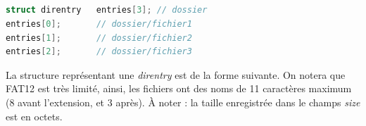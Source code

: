 \documentclass[11pt,a4paper]{article}
\begin{document}
\begin{table}[ht!]
  \centering
  \begin{minipage}{0.3\textwidth}

\noindent {} \\
 \\
 \\
 \\

  \end{minipage}
  \hfillx
  \begin{minipage}{0.6\textwidth}

\begin{lstlisting}[language=C,commentstyle=\color{commentgreen}]
struct direntry   entries[3]; // dossier
entries[0];       // dossier/fichier1
entries[1];       // dossier/fichier2
entries[2];       // dossier/fichier3 \end{lstlisting}

  \end{minipage}
\end{table}

\newpage

La structure représentant une \textit{direntry} est de la forme suivante.
On notera que FAT12 est très limité, ainsi, les fichiers ont des noms de 11 caractères maximum (8 avant l'extension, et 3 après).
\`A noter : la taille enregistrée dans le champs \textit{size} est en octets.
\end{document}
